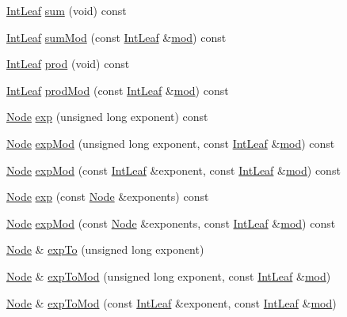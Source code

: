 \begin{DoxyCompactItemize}
\hyperlink{class_int_leaf}{Int\-Leaf} \hyperlink{class_node_ac2103aa6d114e52dce1743be7aa4c1d0}{sum} (void) const 
\item 
\hyperlink{class_int_leaf}{Int\-Leaf} \hyperlink{class_node_ab70ce6887d26a52ff54bbc96bb79b7a4}{sum\-Mod} (const \hyperlink{class_int_leaf}{Int\-Leaf} \&\hyperlink{class_node_a7744980c6da2415c02b583c5b149d50d}{mod}) const 
\item 
\hyperlink{class_int_leaf}{Int\-Leaf} \hyperlink{class_node_ae2b74409d1e5040d11890cfae5a1713c}{prod} (void) const 
\item 
\hyperlink{class_int_leaf}{Int\-Leaf} \hyperlink{class_node_af18b21646a0a3e08690de85ffb1d3355}{prod\-Mod} (const \hyperlink{class_int_leaf}{Int\-Leaf} \&\hyperlink{class_node_a7744980c6da2415c02b583c5b149d50d}{mod}) const 
\item 
\hyperlink{class_node}{Node} \hyperlink{class_node_a675af8768a53b4c55dde07ba3ee4e335}{exp} (unsigned long exponent) const 
\item 
\hyperlink{class_node}{Node} \hyperlink{class_node_a2cf5726aef85163ee34aff6f953897fe}{exp\-Mod} (unsigned long exponent, const \hyperlink{class_int_leaf}{Int\-Leaf} \&\hyperlink{class_node_a7744980c6da2415c02b583c5b149d50d}{mod}) const 
\item 
\hyperlink{class_node}{Node} \hyperlink{class_node_ad01843ea664f09880c82a949e094a107}{exp\-Mod} (const \hyperlink{class_int_leaf}{Int\-Leaf} \&exponent, const \hyperlink{class_int_leaf}{Int\-Leaf} \&\hyperlink{class_node_a7744980c6da2415c02b583c5b149d50d}{mod}) const 
\item 
\hyperlink{class_node}{Node} \hyperlink{class_node_af49a45863e320ed7b81ff96e4e35a73e}{exp} (const \hyperlink{class_node}{Node} \&exponents) const 
\item 
\hyperlink{class_node}{Node} \hyperlink{class_node_a270a6b9f196218ae688e34ec969f465f}{exp\-Mod} (const \hyperlink{class_node}{Node} \&exponents, const \hyperlink{class_int_leaf}{Int\-Leaf} \&\hyperlink{class_node_a7744980c6da2415c02b583c5b149d50d}{mod}) const 
\item 
\hyperlink{class_node}{Node} \& \hyperlink{class_node_a57700c1125aaf77210924a2acc128f48}{exp\-To} (unsigned long exponent)
\item 
\hyperlink{class_node}{Node} \& \hyperlink{class_node_a430517fa1163f53df68e9be38288dcd6}{exp\-To\-Mod} (unsigned long exponent, const \hyperlink{class_int_leaf}{Int\-Leaf} \&\hyperlink{class_node_a7744980c6da2415c02b583c5b149d50d}{mod})
\item 
\hyperlink{class_node}{Node} \& \hyperlink{class_node_afc7a7735704c514be511d52880a7c94c}{exp\-To\-Mod} (const \hyperlink{class_int_leaf}{Int\-Leaf} \&exponent, const \hyperlink{class_int_leaf}{Int\-Leaf} \&\hyperlink{class_node_a7744980c6da2415c02b583c5b149d50d}{mod})

\end{DoxyCompactItemize}
